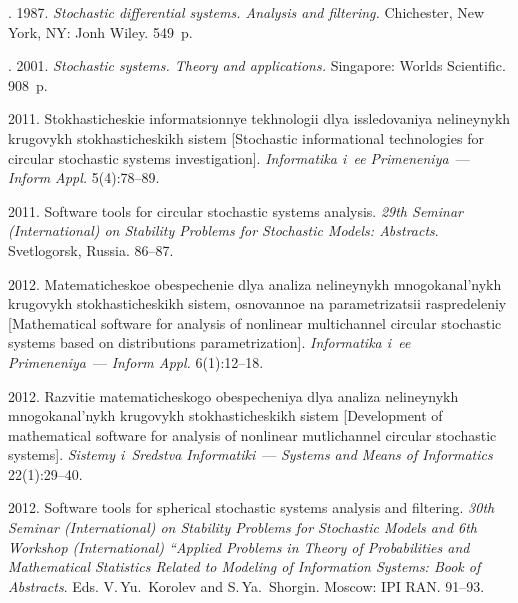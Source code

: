 
  \begin{multicols}{2}

\renewcommand{\bibname}{\protect\rmfamily References}

{\small\frenchspacing
 {%
 \begin{thebibliography}{99}


.  1987.
\textit{Stochastic differential systems. Analysis and filtering.}
Chichester, New York, NY: Jonh Wiley. 549~p.

. 2001.
\textit{Stochastic systems. Theory and  applications.}
Singapore: Worlds Scientific. 908~p.


 2011.
Stokhasticheskie informatsionnye tekhnologii dlya issledovaniya
nelineynykh krugovykh stokhasticheskikh sistem [Stochastic informational
technologies for circular stochastic systems investigation].
\textit{Informatika i~ee Primeneniya}~--- \textit{Inform Appl.} 5(4):78--89.

 2011.
Software tools for circular stochastic systems analysis.
\textit{29th  Seminar (International) on Stability Problems for Stochastic Models:
Abstracts}. Svetlogorsk, Russia. 86--87.


 2012.
Matematicheskoe obespechenie dlya analiza nelineynykh mnogokanal'nykh
krugovykh stokhasticheskikh sistem, osnovannoe na paramet\-ri\-za\-tsii raspredeleniy
[Mathematical software for analysis of nonlinear multichannel circular
stochastic systems based on distributions parametrization].
\textit{Informatika i~ee Primeneniya}~--- \textit{Inform Appl.} 6(1):12--18.

2012.
Razvitie matematicheskogo obespecheniya dlya analiza nelineynykh mnogokanal'nykh
krugovykh stokhasticheskikh sistem [Development of mathematical software
for analysis of nonlinear mutlichannel circular stochastic systems].
\textit{Sistemy i~Sredstva Informatiki}~--- \textit{Systems and Means of Informatics}
 22(1):29--40.

  2012.
Software tools for spherical stochastic systems analysis and
filtering.  \textit{30th Seminar (International) on Stability Problems 
for Stochastic Models and 6th Workshop (International) ``Applied Problems in 
Theory of Probabilities and Mathematical Statistics Related to Modeling of 
Information Systems: Book of Abstracts}. Eds. V.\,Yu.~Korolev and S.\,Ya.~Shorgin.
Moscow:   IPI RAN. 91--93.


\end{thebibliography}}}
\end{multicols}
